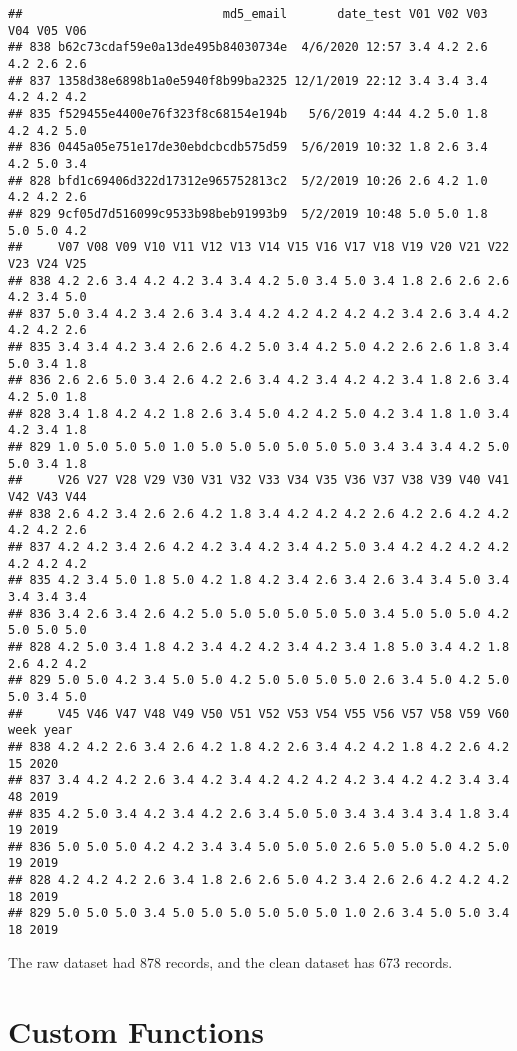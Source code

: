 \documentclass[
]{article}
\newenvironment{Shaded}{\begin{snugshade}}{\end{snugshade}}
\begin{document}
\begin{Shaded}
\begin{Highlighting}[]
\begin{verbatim}
##                            md5_email       date_test V01 V02 V03 V04 V05 V06
## 838 b62c73cdaf59e0a13de495b84030734e  4/6/2020 12:57 3.4 4.2 2.6 4.2 2.6 2.6
## 837 1358d38e6898b1a0e5940f8b99ba2325 12/1/2019 22:12 3.4 3.4 3.4 4.2 4.2 4.2
## 835 f529455e4400e76f323f8c68154e194b   5/6/2019 4:44 4.2 5.0 1.8 4.2 4.2 5.0
## 836 0445a05e751e17de30ebdcbcdb575d59  5/6/2019 10:32 1.8 2.6 3.4 4.2 5.0 3.4
## 828 bfd1c69406d322d17312e965752813c2  5/2/2019 10:26 2.6 4.2 1.0 4.2 4.2 2.6
## 829 9cf05d7d516099c9533b98beb91993b9  5/2/2019 10:48 5.0 5.0 1.8 5.0 5.0 4.2
##     V07 V08 V09 V10 V11 V12 V13 V14 V15 V16 V17 V18 V19 V20 V21 V22 V23 V24 V25
## 838 4.2 2.6 3.4 4.2 4.2 3.4 3.4 4.2 5.0 3.4 5.0 3.4 1.8 2.6 2.6 2.6 4.2 3.4 5.0
## 837 5.0 3.4 4.2 3.4 2.6 3.4 3.4 4.2 4.2 4.2 4.2 4.2 3.4 2.6 3.4 4.2 4.2 4.2 2.6
## 835 3.4 3.4 4.2 3.4 2.6 2.6 4.2 5.0 3.4 4.2 5.0 4.2 2.6 2.6 1.8 3.4 5.0 3.4 1.8
## 836 2.6 2.6 5.0 3.4 2.6 4.2 2.6 3.4 4.2 3.4 4.2 4.2 3.4 1.8 2.6 3.4 4.2 5.0 1.8
## 828 3.4 1.8 4.2 4.2 1.8 2.6 3.4 5.0 4.2 4.2 5.0 4.2 3.4 1.8 1.0 3.4 4.2 3.4 1.8
## 829 1.0 5.0 5.0 5.0 1.0 5.0 5.0 5.0 5.0 5.0 5.0 3.4 3.4 3.4 4.2 5.0 5.0 3.4 1.8
##     V26 V27 V28 V29 V30 V31 V32 V33 V34 V35 V36 V37 V38 V39 V40 V41 V42 V43 V44
## 838 2.6 4.2 3.4 2.6 2.6 4.2 1.8 3.4 4.2 4.2 4.2 2.6 4.2 2.6 4.2 4.2 4.2 4.2 2.6
## 837 4.2 4.2 3.4 2.6 4.2 4.2 3.4 4.2 3.4 4.2 5.0 3.4 4.2 4.2 4.2 4.2 4.2 4.2 4.2
## 835 4.2 3.4 5.0 1.8 5.0 4.2 1.8 4.2 3.4 2.6 3.4 2.6 3.4 3.4 5.0 3.4 3.4 3.4 3.4
## 836 3.4 2.6 3.4 2.6 4.2 5.0 5.0 5.0 5.0 5.0 5.0 3.4 5.0 5.0 5.0 4.2 5.0 5.0 5.0
## 828 4.2 5.0 3.4 1.8 4.2 3.4 4.2 4.2 3.4 4.2 3.4 1.8 5.0 3.4 4.2 1.8 2.6 4.2 4.2
## 829 5.0 5.0 4.2 3.4 5.0 5.0 4.2 5.0 5.0 5.0 5.0 2.6 3.4 5.0 4.2 5.0 5.0 3.4 5.0
##     V45 V46 V47 V48 V49 V50 V51 V52 V53 V54 V55 V56 V57 V58 V59 V60 week year
## 838 4.2 4.2 2.6 3.4 2.6 4.2 1.8 4.2 2.6 3.4 4.2 4.2 1.8 4.2 2.6 4.2   15 2020
## 837 3.4 4.2 4.2 2.6 3.4 4.2 3.4 4.2 4.2 4.2 4.2 3.4 4.2 4.2 3.4 3.4   48 2019
## 835 4.2 5.0 3.4 4.2 3.4 4.2 2.6 3.4 5.0 5.0 3.4 3.4 3.4 3.4 1.8 3.4   19 2019
## 836 5.0 5.0 5.0 4.2 4.2 3.4 3.4 5.0 5.0 5.0 2.6 5.0 5.0 5.0 4.2 5.0   19 2019
## 828 4.2 4.2 4.2 2.6 3.4 1.8 2.6 2.6 5.0 4.2 3.4 2.6 2.6 4.2 4.2 4.2   18 2019
## 829 5.0 5.0 5.0 3.4 5.0 5.0 5.0 5.0 5.0 5.0 1.0 2.6 3.4 5.0 5.0 3.4   18 2019
\end{verbatim}

The raw dataset had 878 records, and the clean dataset has 673 records.

\hypertarget{custom-functions}{%
\section{Custom Functions}\label{custom-functions}}


\end{Highlighting}
\end{Shaded}
\end{document}
